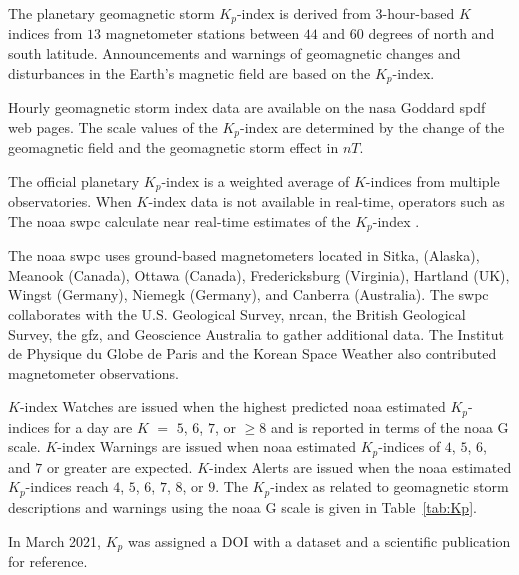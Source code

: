 \documentclass[sn-mathphys-num]{sn-jnl}%
\begin{document}
The planetary geomagnetic storm $K_{p}$-index \cite{Matzka2024} is derived from $3$-hour-based $K$ indices from $13$ magnetometer stations between $44$ and $60$ degrees of north and south latitude. Announcements and warnings \cite{NOAA2024cAlertsWatches} of geomagnetic changes and disturbances in the Earth's magnetic field are based on the $K_{p}$-index.

Hourly geomagnetic storm index data are available on the \acrshort{nasa} Goddard \acrshort{spdf} \cite{Papitashvili2024About, Papitashvili2024Explorer} web pages. The scale values of the $K_{p}$-index are determined by the change of the geomagnetic field and the geomagnetic storm effect in $nT$.

The official planetary $K_{p}$-index is a weighted average of $K$-indices from multiple observatories. When $K$-index data is not available in real-time, operators such as The \acrfull{noaa} \acrfull{swpc} calculate near real-time estimates of the $K_{p}$-index \cite{Myint2022}.

The \acrshort{noaa} \acrshort{swpc} \cite{NOAA2024dPlanetary} uses ground-based magnetometers located in Sitka, (Alaska), Meanook (Canada), Ottawa (Canada), Fredericksburg (Virginia), Hartland (UK), Wingst (Germany), Niemegk (Germany), and Canberra (Australia). The \acrshort{swpc} collaborates with the U.S. Geological Survey, \acrfull{nrcan}, the British Geological Survey, the \acrfull{gfz}, and Geoscience Australia to gather additional data. The Institut de Physique du Globe de Paris and the Korean Space Weather also contributed magnetometer observations. 

$K$-index Watches are issued when the highest predicted \acrshort{noaa} estimated $K_{p}$-indices for a day are $K$ $=$ $5$, $6$, $7$, or $\geq 8$ and is reported in terms of the \acrshort{noaa} G scale. $K$-index Warnings are issued when \acrshort{noaa} estimated $K_{p}$-indices of $4$, $5$, $6$, and $7$ or greater are expected. $K$-index Alerts are issued when the \acrshort{noaa} estimated $K_{p}$-indices reach $4$, $5$, $6$, $7$, $8$, or $9$. The $K_{p}$-index as related to geomagnetic storm descriptions and warnings using the \acrshort{noaa} G scale \cite{NOAA2024eSpace, NOAA2024fScales} is given in Table~\ref{tab:Kp}.

In March 2021, $K_{p}$ was assigned a DOI with a dataset \cite{Matzka2021a} and a scientific publication \cite{Matzka2021b} for reference.
\end{document}
